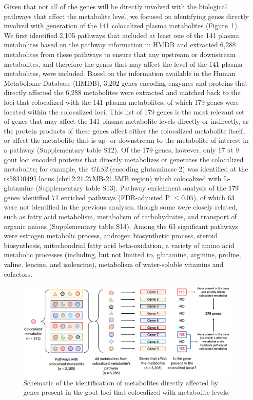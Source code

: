 \documentclass[gucdd,article,submit,pdftex,moreauthors]{Definitions/mdpi}
\begin{document}
Given that not all of the genes will be directly involved with the biological pathways that affect the metabolite level, we focused on identifying genes directly involved with generation of the 141 colocalized plasma metabolites (Figure~\ref{fig:met_assoc_w_loci}).
We first identified 2,105 pathways that included at least one of the 141 plasma metabolites based on the pathway information in HMDB and extracted 6,288 metabolites from these pathways to ensure that any upstream or downstream metabolites, and therefore the genes that may affect the level of the 141 plasma metabolites, were included.
Based on the information available in the Human Metabolome Database (HMDB), 3,202 genes encoding enzymes and proteins that directly affected the 6,288 metabolites were extracted and matched back to the loci that colocalized with the 141 plasma metabolites, of which 179 genes were located within the colocalized loci.
This list of 179 genes is the most relevant set of genes that may affect the 141 plasma metabolite levels directly or indirectly, as the protein products of these genes affect either the colocalized metabolite itself, or affect the metabolite that is up- or downstream to the metabolite of interest in a pathway (Supplementary table S12).
Of the 179 genes, however, only 17 at 9 gout loci encoded proteins that directly metabolizes or generates the colocalized metabolite; for example, the \textit{GLS2} (encoding glutaminase 2) was identified at the rs58310495 locus (chr12:21.27MB-21.5MB region) which colocalized with L-glutamine (Supplementary table S13).
Pathway enrichment analysis of the 179 genes identified 71 enriched pathways (FDR-adjusted P $\le 0.05$), of which 63 were not identified in the previous analyses, though some were closely related, such as fatty acid metabolism, metabolism of carbohydrates, and transport of organic anions (Supplementary table S14).
Among the 63 significant pathways were estrogen metabolic process, androgen biosynthetic process, steroid biosynthesis, mitochondrial fatty acid beta-oxidation, a variety of amino acid metabolic processes (including, but not limited to, glutamine, arginine, proline, valine, leucine, and isoleucine), metabolism of water-soluble vitamins and cofactors.

\begin{figure}
	\centering
	\includegraphics[width=1.0\textwidth]{"./ppt_image.v2.png"}
	\caption{Schematic of the identification of metabolites directly affected by genes present in the gout loci that colocalized with metabolite levels.}
	\label{fig:met_assoc_w_loci}
\end{figure}
\end{document}
